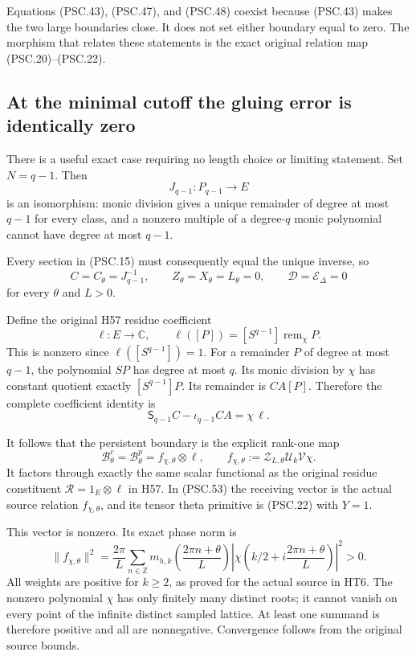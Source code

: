 Equations (PSC.43), (PSC.47), and (PSC.48) coexist because (PSC.43) makes the two large boundaries close. It does not set either boundary equal to zero. The morphism that relates these statements is the exact original relation map (PSC.20)–(PSC.22).

\subsection{At the minimal cutoff the gluing error is identically zero}

There is a useful exact case requiring no length choice or limiting statement. Set \(N=q-1\). Then
\[
 J_{q-1}:P_{q-1}\longrightarrow E
 \]
is an isomorphism: monic division gives a unique remainder of degree at most \(q-1\) for every class, and a nonzero multiple of a degree-\(q\) monic polynomial cannot have degree at most \(q-1\).

Every section in (PSC.15) must consequently equal the unique inverse, so
\[
 C=C_\theta=J_{q-1}^{-1},\qquad
 Z_\theta=X_\theta=L_\theta=0,\qquad
 \mathscr D=\mathscr E_\Delta=0
 \tag{PSC.50}
\]
for every \(\theta\) and \(L>0\).

Define the original H57 residue coefficient
\[
 \ell:E\longrightarrow\mathbb C,\qquad
 \ell([P])=[S^{q-1}]\operatorname{rem}_\chi P.
 \tag{PSC.51}
\]
This is nonzero since \(\ell([S^{q-1}])=1\).
For a remainder \(P\) of degree at most \(q-1\), the polynomial \(SP\) has degree at most \(q\). Its monic division by \(\chi\) has constant quotient exactly \([S^{q-1}]P\). Its remainder is \(C A[P]\). Therefore the complete coefficient identity is
\[
 \mathsf S_{q-1}C-\iota_{q-1}CA=\chi\,\ell.
 \tag{PSC.52}
\]

It follows that the persistent boundary is the explicit rank-one map
\[
 \boxed{
 \mathscr B^c_\theta=\mathscr B^p_\theta
 =f_{\chi,\theta}\otimes\ell,\qquad
 f_{\chi,\theta}
 :=\mathcal Z_{L,\theta}\mathcal U_k\mathcal V\chi.}
 \tag{PSC.53}
\]
It factors through exactly the same scalar functional as the original residue constituent
\(\mathcal R=1_E\otimes\ell\) in H57. In (PSC.53) the receiving vector is the actual source relation \(f_{\chi,\theta}\), and its tensor theta primitive is (PSC.22) with \(Y=1\).

This vector is nonzero. Its exact phase norm is
\[
 \|f_{\chi,\theta}\|^2
 =\frac{2\pi}{L}\sum_{n\in\mathbb Z}
   m_{h,k}\!\left(\frac{2\pi n+\theta}{L}\right)
   \left|\chi\!\left(k/2+i\frac{2\pi n+\theta}{L}\right)\right|^2>0.
 \tag{PSC.54}
\]
All weights are positive for \(k\geq2\), as proved for the actual source in HT6. The nonzero polynomial \(\chi\) has only finitely many distinct roots; it cannot vanish on every point of the infinite distinct sampled lattice. At least one summand is therefore positive and all are nonnegative. Convergence follows from the original source bounds.


